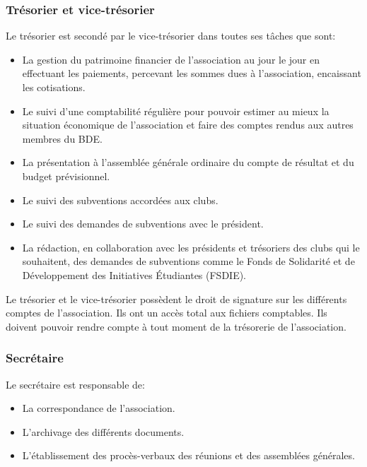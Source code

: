 \documentclass{article} %
\begin{document}
			\subsubsection{Trésorier et vice-trésorier}
\label{ssub:tresorier_et_vice_tresorier}

				Le trésorier est secondé par le vice-trésorier dans toutes ses
				tâches que sont:
				\begin{itemize}
					\item La gestion du patrimoine financier de l’association au
						jour le jour en effectuant les paiements, percevant les
						sommes dues à l’association, encaissant les cotisations.
					\item Le suivi d’une comptabilité régulière pour pouvoir
						estimer au mieux la situation économique de
						l’association et faire des comptes rendus aux autres
						membres du BDE\@.
					\item La présentation à l’assemblée générale ordinaire du
						compte de résultat et du budget prévisionnel.
					\item Le suivi des subventions accordées aux clubs.
					\item Le suivi des demandes de subventions avec le
						président.
					\item La rédaction, en collaboration avec
						les présidents et trésoriers des clubs qui le
						souhaitent, des demandes de subventions comme le Fonds
						de Solidarité et de Développement des Initiatives
						Étudiantes (FSDIE).
				\end{itemize}

				Le trésorier et le vice-trésorier possèdent le droit de
				signature sur les différents comptes de
				l'association. Ils ont un accès
				total aux fichiers comptables. Ils doivent pouvoir rendre compte
				à tout moment de la trésorerie de l’association.

			\subsubsection{Secrétaire}
\label{ssub:secretaire}

				Le secrétaire est responsable de:
				\begin{itemize}
					\item La correspondance de l’association.
					\item L’archivage des différents documents.
					\item L’établissement des procès-verbaux des réunions et des
						assemblées générales.
				\end{itemize}
\end{document}
